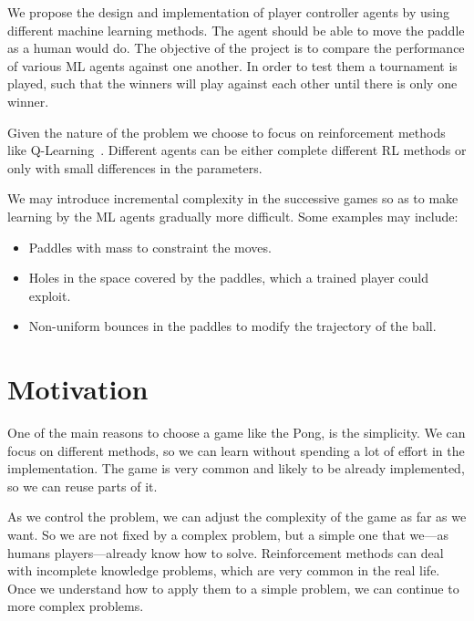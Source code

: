 \documentclass[a4paper,twocolumn]{article}
\begin{document}
We propose the design and implementation of player controller agents by using 
different machine learning methods. The agent should be able to move the paddle 
as a human would do.  The objective of the project is to compare the performance 
of various ML agents against one another. In order to test them a tournament is 
played, such that the winners will play against each other until there is only 
one winner.

Given the nature of the problem we choose to focus on reinforcement methods like 
Q-Learning~\cite{SuttonBarto98}. Different agents can be either complete 
different RL methods or only with small differences in the parameters.

We may introduce incremental complexity in the successive games so as to make
learning by the ML agents gradually more difficult. Some examples may include:


\begin{itemize}
	\item Paddles with mass to constraint the moves.
	\item Holes in the space covered by the paddles, which a trained player could
		exploit.
	\item Non-uniform bounces in the paddles to modify the trajectory of the ball.
\end{itemize}

%

\section*{Motivation} %

One of the main reasons to choose a game like the Pong, is the simplicity. We
can focus on different methods, so we can learn without spending a lot of effort
in the implementation. The game is very common and likely to be already
implemented, so we can reuse parts of it.

As we control the problem, we can adjust the complexity of the game as far as we
want. So we are not fixed by a complex problem, but a simple one that we---as
humans players---already know how to solve. Reinforcement methods can deal with 
incomplete knowledge problems, which are very common in the real life. Once we 
understand how to apply them to a simple problem, we can continue to more 
complex problems.




\end{document}
